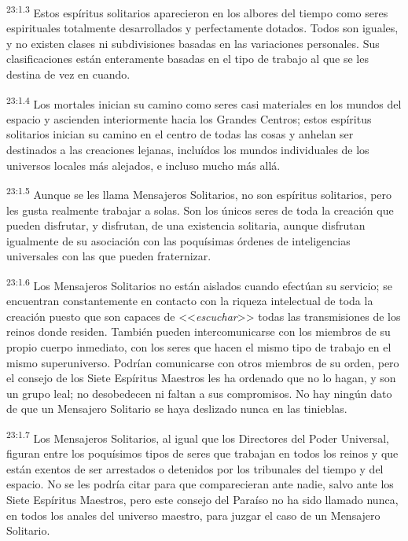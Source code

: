 \par
\textsuperscript{23:1.3} Estos espíritus solitarios aparecieron en los albores del tiempo como seres espirituales totalmente desarrollados y perfectamente dotados. Todos son iguales, y no existen clases ni subdivisiones basadas en las variaciones personales. Sus clasificaciones están enteramente basadas en el tipo de trabajo al que se les destina de vez en cuando.

\par
\textsuperscript{23:1.4} Los mortales inician su camino como seres casi materiales en los mundos del espacio y ascienden interiormente hacia los Grandes Centros; estos espíritus solitarios inician su camino en el centro de todas las cosas y anhelan ser destinados a las creaciones lejanas, incluídos los mundos individuales de los universos locales más alejados, e incluso mucho más allá.

\par
\textsuperscript{23:1.5} Aunque se les llama Mensajeros Solitarios, no son espíritus solitarios, pero les gusta realmente trabajar a solas. Son los únicos seres de toda la creación que pueden disfrutar, y disfrutan, de una existencia solitaria, aunque disfrutan igualmente de su asociación con las poquísimas órdenes de inteligencias universales con las que pueden fraternizar.

\par
\textsuperscript{23:1.6} Los Mensajeros Solitarios no están aislados cuando efectúan su servicio; se encuentran constantemente en contacto con la riqueza intelectual de toda la creación puesto que son capaces de <<\textit{escuchar}>> todas las transmisiones de los reinos donde residen. También pueden intercomunicarse con los miembros de su propio cuerpo inmediato, con los seres que hacen el mismo tipo de trabajo en el mismo superuniverso. Podrían comunicarse con otros miembros de su orden, pero el consejo de los Siete Espíritus Maestros les ha ordenado que no lo hagan, y son un grupo leal; no desobedecen ni faltan a sus compromisos. No hay ningún dato de que un Mensajero Solitario se haya deslizado nunca en las tinieblas.

\par
\textsuperscript{23:1.7} Los Mensajeros Solitarios, al igual que los Directores del Poder Universal, figuran entre los poquísimos tipos de seres que trabajan en todos los reinos y que están exentos de ser arrestados o detenidos por los tribunales del tiempo y del espacio. No se les podría citar para que comparecieran ante nadie, salvo ante los Siete Espíritus Maestros, pero este consejo del Paraíso no ha sido llamado nunca, en todos los anales del universo maestro, para juzgar el caso de un Mensajero Solitario.

